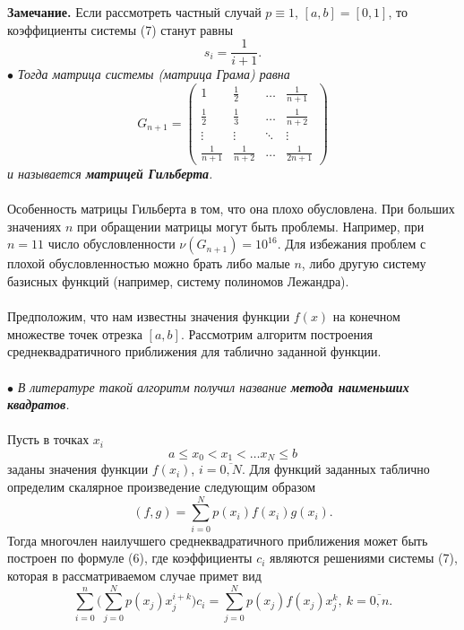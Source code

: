 \documentclass[a4paper, 12pt]{report}
\numberwithin{equation}{section}
\renewcommand{\leq}{\leqslant}
\begin{document}
 \textbf{Замечание.} Если рассмотреть частный случай $p\equiv 1$, $[a,b] = [0,1]$, то коэффициенты системы (7) станут равны $$s_i = \dfrac{1}{i+1}.$$
 $\bullet$ \textit{Тогда матрица системы (матрица Грама) равна} $$G_{n+1} = \begin{pmatrix}
 		1 & \frac12 & \dots &\frac{1}{n+1}\\
 		\frac12 & \frac13 & \dots& \frac{1}{n+2}\\
 		\vdots & \vdots & \ddots & \vdots\\
 		\frac{1}{n+1} & \frac{1}{n+2} & \dots & \frac{1}{2n+1}
 	\end{pmatrix}$$ \textit{и называется \textbf{матрицей Гильберта}.}
 \\\\
Особенность матрицы Гильберта в том, что она плохо обусловлена. При больших значениях $n$ при обращении матрицы могут быть проблемы. Например, при $n=11$ число обусловленности $\nu (G_{n+1}) = 10^{16}$. Для избежания проблем с плохой обусловленностью можно брать либо малые $n$, либо другую систему базисных функций (например, систему полиномов Лежандра).\\\\
 	Предположим, что нам известны значения функции $f(x)$ на конечном множестве точек отрезка $[a,b]$. Рассмотрим алгоритм построения среднеквадратичного приближения для таблично заданной функции. 
 	\\\\
 	$\bullet$ \textit{В литературе такой алгоритм получил название \textbf{метода наименьших квадратов}.} \\\\
 	Пусть в точках $x_i$ $$a\leq x_0 < x_1 <\ldots x_N \leq b$$ заданы значения функции $f(x_i)$, $i=\overline{0,N}$. Для функций заданных таблично определим скалярное произведение следующим образом $$(f,g) = \sum_{i=0}^{N}p(x_i)f(x_i)g(x_i).$$
 	Тогда многочлен наилучшего среднеквадратичного приближения может быть построен по формуле (6), где коэффициенты $c_i$ являются решениями системы (7), которая в рассматриваемом случае примет вид \begin{equation}
 		\sum_{i=0}^{n}\Big(\sum_{j=0}^{N}p(x_j)x_j^{i+k}\Big) c_i = \sum_{j=0}^{N} p(x_j) f(x_j) x_j^k,\ k =\overline{0,n}.
 	\end{equation}
\end{document}
